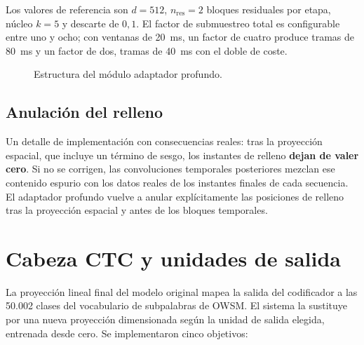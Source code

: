 Los valores de referencia son $d = 512$, $n_{\mathrm{res}} = 2$ bloques residuales por etapa, núcleo $k = 5$ y descarte de $0{,}1$. El factor de submuestreo total es configurable entre uno y ocho; con ventanas de \SI{20}{\milli\second}, un factor de cuatro produce tramas de \SI{80}{\milli\second} y un factor de dos, tramas de \SI{40}{\milli\second} con el doble de coste.

\begin{figure}[H]
  \centering
  \caption{Estructura del módulo adaptador profundo.}
  \label{fig:frontend-deep}
\end{figure}

\subsection{Anulación del relleno}

Un detalle de implementación con consecuencias reales: tras la proyección espacial, que incluye un término de sesgo, los instantes de relleno \textbf{dejan de valer cero}. Si no se corrigen, las convoluciones temporales posteriores mezclan ese contenido espurio con los datos reales de los instantes finales de cada secuencia. El adaptador profundo vuelve a anular explícitamente las posiciones de relleno tras la proyección espacial y antes de los bloques temporales.

\section{Cabeza CTC y unidades de salida}
\label{sec:cabeza-ctc}

La proyección lineal final del modelo original mapea la salida del codificador a las 50.002 clases del vocabulario de subpalabras de OWSM. El sistema la sustituye por una nueva proyección dimensionada según la unidad de salida elegida, entrenada desde cero. Se implementaron cinco objetivos:

